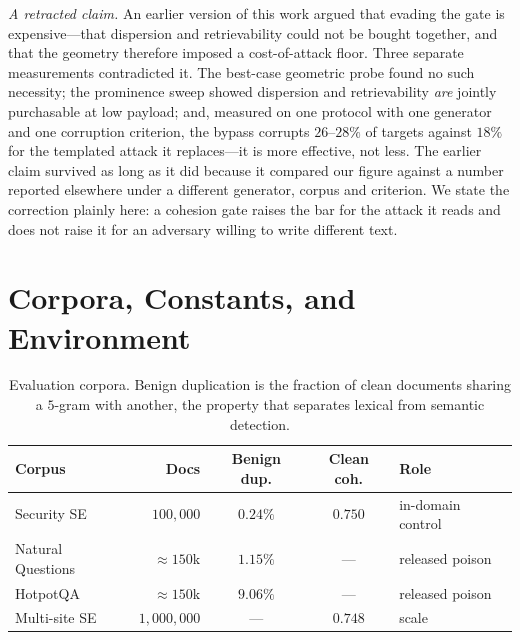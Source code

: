 \documentclass[10pt,journal,compsoc]{IEEEtran}
\begin{document}
\emph{A retracted claim.} An earlier version of this work argued that evading the gate is
expensive---that dispersion and retrievability could not be bought together, and that the
geometry therefore imposed a cost-of-attack floor. Three separate measurements contradicted it.
The best-case geometric probe found no such necessity; the prominence sweep showed dispersion and
retrievability \emph{are} jointly purchasable at low payload; and, measured on one protocol with
one generator and one corruption criterion, the bypass corrupts $26$--$28\%$ of targets against
$18\%$ for the templated attack it replaces---it is more effective, not less. The earlier claim
survived as long as it did because it compared our figure against a number reported elsewhere
under a different generator, corpus and criterion. We state the correction plainly here: a
cohesion gate raises the bar for the attack it reads and does not raise it for an adversary
willing to write different text.


\section{Corpora, Constants, and Environment}
\label{app:setup}

\begin{table}[t]
\centering
\caption{Evaluation corpora. Benign duplication is the fraction of clean documents sharing a
$5$-gram with another, the property that separates lexical from semantic detection.}
\label{tab:corpora}
\setlength{\tabcolsep}{4pt}
\begin{tabular}{lrccl}
\toprule
Corpus & Docs & Benign dup. & Clean coh. & Role \\
\midrule
Security SE      & $100{,}000$   & $0.24\%$ & $0.750$ & in-domain control \\
Natural Questions& $\approx\!150$k & $1.15\%$ & --- & released poison \\
HotpotQA         & $\approx\!150$k & $9.06\%$ & --- & released poison \\
Multi-site SE    & $1{,}000{,}000$ & --- & $0.748$ & scale \\
\bottomrule
\end{tabular}
\end{table}
\end{document}
